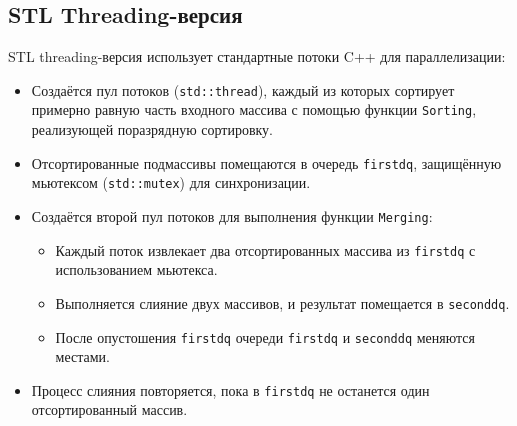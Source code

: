 \documentclass[a4paper,12pt]{article}
\begin{document}
\subsection{STL Threading-версия}
STL threading-версия использует стандартные потоки C++ для параллелизации:
\begin{itemize}
    \item Создаётся пул потоков (\texttt{std::thread}), каждый из которых сортирует примерно равную часть входного массива с помощью функции \texttt{Sorting}, реализующей поразрядную сортировку.
    \item Отсортированные подмассивы помещаются в очередь \texttt{firstdq}, защищённую мьютексом (\texttt{std::mutex}) для синхронизации.
    \item Создаётся второй пул потоков для выполнения функции \texttt{Merging}:
        \begin{itemize}
            \item Каждый поток извлекает два отсортированных массива из \texttt{firstdq} с использованием мьютекса.
            \item Выполняется слияние двух массивов, и результат помещается в \texttt{seconddq}.
            \item После опустошения \texttt{firstdq} очереди \texttt{firstdq} и \texttt{seconddq} меняются местами.
        \end{itemize}
    \item Процесс слияния повторяется, пока в \texttt{firstdq} не останется один отсортированный массив.
\end{itemize}
\end{document}
